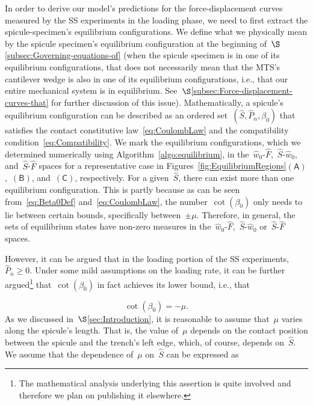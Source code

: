 \documentclass[preprint,10pt,times]{elsarticle}
\numberwithin{equation}{section}
\newcommand{\pr}[1]{\left( #1 \right)}
\newcommand{\subf}[1]{\pr{\textsf{#1}}}
\begin{document}
In order to derive our model's predictions for the force-displacement
curves measured by the SS experiments in the loading phase, we need
to first extract the spicule-specimen's equilibrium configurations.
We define what we physically mean by the spicule specimen's equilibrium
configuration at the beginning of~$\S$\ref{subsec:Governing-equations-of}
(when the spicule specimen is in one of its equilibrium configurations,
that does not necessarily mean that the MTS's cantilever wedge is
also in one of its equilibrium configurations, i.e., that our entire
mechanical system is in equilibrium. See~$\S$\ref{subsec:Force-displacement-curves-that}
for further discussion of this issue). Mathematically, a spicule's
equilibrium configuration can be described as an ordered set~$\pr{\hat{S},\hat{P}_{n},\beta_0}$
that satisfies the contact constitutive law~\eqref{eq:CoulombLaw}
and the compatibility condition~\eqref{eq:Compatibility}. We mark
the equilibrium configurations, which we determined numerically using
Algorithm~\ref{algo:equilibrium}, in the~$\hat{w}_0$-$\hat{F}$,~$\hat{S}$-$\hat{w}_0$,
and~$\hat{S}$-$\hat{F}$ spaces for a representative case in Figures{~\ref{fig:EquilibriumRegions}}$\subf{A}$,~$\subf{B}$,
and~$\subf{C}$, respectively. For a given~$\hat{S}$, there can
exist more than one equilibrium configuration. This is partly because
as can be seen from~\eqref{eq:Beta0Def} and~\eqref{eq:CoulombLaw},
the number~$\cot\pr{\beta_0}$ only needs to lie between certain
bounds, specifically between~$\pm\mu$. Therefore, in general, the
sets of equilibrium states have non-zero measures in the~$\hat{w}_0$-$\hat{F}$,~$\hat{S}$-$\hat{w}_0$
or~$\hat{S}$-$\hat{F}$ spaces.

However, it can be argued that in the loading portion of the SS experiments,~$\hat{P}_{n}\ge 0$.
Under some mild assumptions on the loading rate, it can be further
argued\footnote{The mathematical analysis underlying this assertion is quite involved
and therefore we plan on publishing it elsewhere.} that~$\cot\pr{\beta_0}$ in fact achieves its lower bound, i.e.,
that

\begin{equation}
\cot\pr{\beta_0}=-\mu.
\label{eq:MoreRestrictiveCoulombLaw}
\end{equation}As we discussed in~$\S$\ref{sec:Introduction}, it is reasonable
to assume that~$\mu$ varies along the spicule's length. That is,
the value of~$\mu$ depends on the contact position between the spicule
and the trench's left edge, which, of course, depends on~$\hat{S}$.
We assume that the dependence of~$\mu$ on~$\hat{S}$ can be expressed
as
\end{document}

